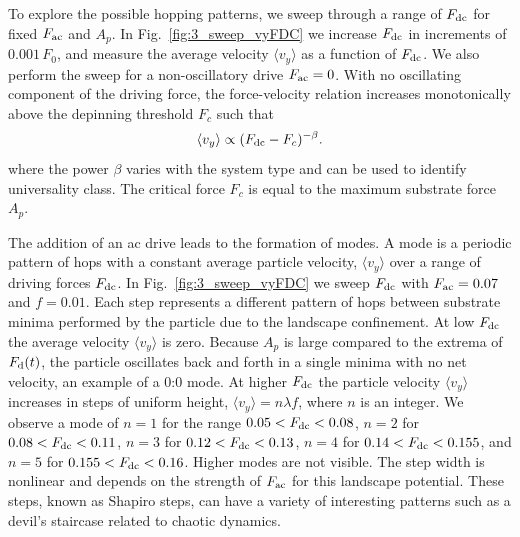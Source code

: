 \documentclass[preprint,showpacs,preprintnumbers,amsmath,amssymb,aps,prb]{revtex4-1}
\theoremstyle{remark}
\begin{document}
To explore the possible hopping patterns,
we sweep through a range of $F_{\rm dc}$ for fixed $F_{\rm ac}$ and $A_p$.
In Fig.~\ref{fig:3_sweep_vyFDC} 
we increase $F_{\rm dc}$ in increments of $0.001\,F_0$,
and 
measure the average velocity $\langle v_y \rangle $ 
as a function of $F_{\rm dc}$.
We also perform the sweep for a non-oscillatory drive $F_{\rm ac} = 0$.
With no oscillating component of the driving force,
  the force-velocity relation increases monotonically 
  above the depinning threshold $F_c$ such that
  \begin{equation}
    \langle v_y \rangle \propto (F_{\rm dc}-F_c)^{-\beta}.
  \end{equation}
  where the power $\beta$ varies with the
  system type and
  can be used to identify universality class. \cite{Reichhardt2017}
  The critical force $F_c$ is equal to the maximum substrate force
  $A_p$.
  
The addition of an ac drive leads
  to the formation of modes.
  A mode is a periodic pattern of hops
  with a constant average particle velocity, $\langle {v}_{y} \rangle$
  over a range of driving forces $F_{\rm dc}$.
  In Fig.~\ref{fig:3_sweep_vyFDC}
  we sweep $F_{\rm dc}$
  with $F_{\rm ac} = 0.07$ and $f=0.01$.
Each step represents a different pattern of hops
between substrate minima
performed by the particle
due to the landscape confinement.  
At 
low $F_{\rm dc}$ the average velocity $\langle v_y \rangle$ is zero.
Because 
$A_p$ is large compared to the extrema of $F_{\rm d}(t)$,
the particle oscillates back and forth
in a single minima with no net velocity, an example of 
a 0:0 mode.
At higher $F_{\rm dc}$ the particle velocity 
$\langle v_{y} \rangle$ increases in steps of uniform height,
$\langle v_{y} \rangle = n \lambda f$,
where $n$ is an integer.
We observe a mode of $n=1$
for the range $0.05 < F_{\rm dc} < 0.08$,
$n=2$ for $0.08 < F_{\rm dc} < 0.11$,
$n=3$ for $0.12 < F_{\rm dc} < 0.13$,
$n=4$ for $0.14 < F_{\rm dc} < 0.155$, and 
$n=5$ for $0.155 < F_{\rm dc} < 0.16$.
Higher modes are not visible.
The step width is nonlinear
and depends on the strength of $F_{\rm ac}$
for this landscape potential.\cite{Reichhardt2000,Juniper2017}
These steps, known as Shapiro steps, can have a variety of
interesting patterns
such as a devil's staircase related to chaotic dynamics.\cite{Bak1986}
\end{document}
